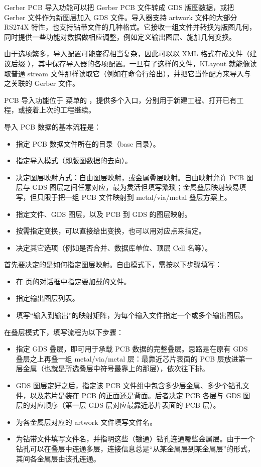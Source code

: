 Gerber PCB 导入功能可以把 Gerber PCB 文件转成 GDS 版图数据，或把 Gerber 文件作为新图层加入 GDS 文件。导入器支持 artwork 文件的大部分 RS274X 特性，也支持钻带文件的几种格式。它接收一组文件并转换为版图几何，同时提供一些功能对数据做相应调整，例如定义输出图层、施加几何变换。

由于选项繁多，导入配置可能变得相当复杂，因此可以以 XML 格式存成文件（建议后缀 ），其中保存导入器的各项配置。一旦有了这样的文件，KLayout 就能像读取普通 stream 文件那样读取它（例如在命令行给出），并把它当作配方来导入与之关联的 Gerber 文件。

PCB 导入功能位于  菜单的 ，提供多个入口，分别用于新建工程、打开已有工程，或接着上次的工程继续。

导入 PCB 数据的基本流程是：

\begin{itemize}
\item 指定 PCB 数据文件所在的目录（base 目录）。
\item 指定导入模式（即版图数据的去向）。
\item 决定图层映射方式：自由图层映射，或金属叠层映射。自由映射允许 PCB 图层与 GDS 图层之间任意对应，最为灵活但填写繁琐；金属叠层映射较易填写，但只限于把一组 PCB 文件映射到 metal/via/metal 叠层方案上。
\item 指定文件、GDS 图层，以及 PCB 到 GDS 的图层映射。
\item 按需指定变换，可以直接给出变换，也可以用对应点来指定。
\item 决定其它选项（例如是否合并、数据库单位、顶层 Cell 名等）。
\end{itemize}

首先要决定的是如何指定图层映射。自由模式下，需按以下步骤填写：

\begin{itemize}
\item 在  页的对话框中指定要加载的文件。
\item 指定输出图层列表。
\item 填写“输入到输出”的映射矩阵，为每个输入文件指定一个或多个输出图层。
\end{itemize}

在叠层模式下，填写流程为以下步骤：

\begin{itemize}
\item 指定 GDS 叠层，即可用于承载 PCB 数据的完整叠层。思路是在原有 GDS 叠层之上再叠一组 metal/via/metal 层：最靠近芯片表面的 PCB 层放进第一层金属（也就是所选叠层中符号最靠上的那层），依次往下排。
\item GDS 图层定好之后，指定该 PCB 文件组中包含多少层金属、多少个钻孔文件，以及芯片是装在 PCB 的正面还是背面。后者决定 PCB 各层与 GDS 图层的对应顺序（第一层 GDS 层对应最靠近芯片表面的 PCB 层）。
\item 为各金属层对应的 artwork 文件填写文件名。
\item 为钻带文件填写文件名，并指明这些（镀通）钻孔连通哪些金属层。由于一个钻孔可以在叠层中连通多层，连接信息总是“从某金属层到某金属层”的形式，其间各金属层由该孔连通。
\end{itemize}

